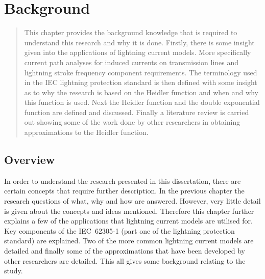 
\chapter{Background} %

\label{ChapterBackground} %

\begin{quote}
This chapter provides the background knowledge that is required to understand this research and why it is done. Firstly, there is some insight given into the applications of lightning current models. More specifically current path analyses for induced currents on transmission lines and lightning stroke frequency component requirements. The terminology used in the IEC lightning protection standard is then defined with some insight as to why the research is based on the Heidler function and when and why this function is used. Next the Heidler function and the double exponential function are defined and discussed. Finally a literature review is carried out showing some of the work done by other researchers in obtaining approximations to the Heidler function.
\end{quote}


\section{Overview}
\label{sec:background_overview}
In order to understand the research presented in this dissertation, there are certain concepts that require further description. In the previous chapter the research questions of what, why and how are answered. However, very little detail is given about the concepts and ideas mentioned. Therefore this chapter further explains a few of the applications that lightning current models are utilised for. Key components of the IEC~62305-1 (part one of the lightning protection standard) are explained. Two of the more common lightning current models are detailed and finally some of the approximations that have been developed by other researchers are detailed. This all gives some background relating to the study.


